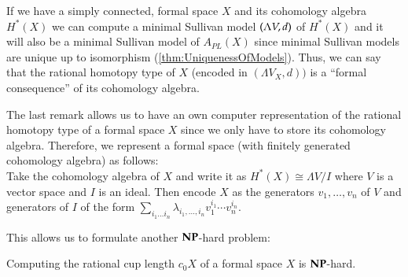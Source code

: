 \begin{Remark}
 If we have a simply connected, formal space $X$ and its cohomology algebra $H^*(X)$ we can compute a minimal Sullivan model
 $(\Lambda V,d)$ of $H^*(X)$ and it will also be a minimal Sullivan model of $A_{PL}(X)$ since 
 minimal Sullivan models are unique up to isomorphism (\ref{thm:UniquenessOfModels}). Thus, we can say
 that the rational homotopy type of $X$ (encoded in $(\Lambda V_X,d))$ is a ``formal consequence'' of its 
 cohomology algebra.
\end{Remark}

\begin{Remark}
 \label{rem:EncodingOfFormalSpaces}
 The last remark allows us to have an own computer representation of the rational homotopy type of 
 a formal space $X$ since we only have to store its cohomology algebra. Therefore, we represent a 
 formal space (with finitely generated cohomology algebra) as follows: \\
 Take the cohomology algebra of $X$ and write it as $H^*(X) \cong \Lambda V / I$ where $V$ is a vector
 space and $I$ is an ideal. Then encode $X$ as the generators $v_1, \ldots, v_n$ of $V$ and generators 
 of $I$ of the form $\sum_{i_1 \ldots i_n} \lambda_{i_1, \ldots , i_n} v_1^{i_1} \cdots v_n^{i_n}$.
\end{Remark}

This allows us to formulate another $\mathbf{NP}$-hard problem:

\begin{Theorem}
 Computing the rational cup length $c_0 X$ of a formal space $X$ is $\mathbf{NP}$-hard.
\end{Theorem}


